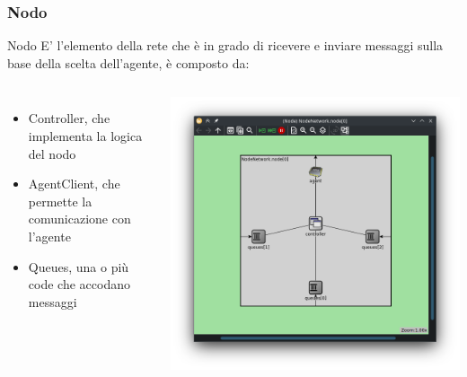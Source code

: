 \documentclass[compress]{beamer}
\begin{document}
\subsubsection*{Nodo}
\begin{frame}{Nodo}
    E' l'elemento della rete che è in grado di ricevere e inviare messaggi sulla base della scelta dell'agente, è composto da:
    \begin{columns}
            \begin{minipage}[b]{1\textwidth}
                \begin{itemize}
                    \item Controller, che implementa la logica del nodo
                    \item AgentClient, che permette la comunicazione con l'agente
                    \item Queues, una o più code che accodano messaggi
                \end{itemize}
            \end{minipage}
            \begin{minipage}{1\textwidth}
                \begin{adjustbox}{margin=0cm 0cm 0.1cm 0.2cm, center} %
                    \includegraphics[width=1\textwidth]{figs/node_layout_3queues.png}
                \end{adjustbox}
            \end{minipage}
    \end{columns}
\end{frame}
\end{document}
